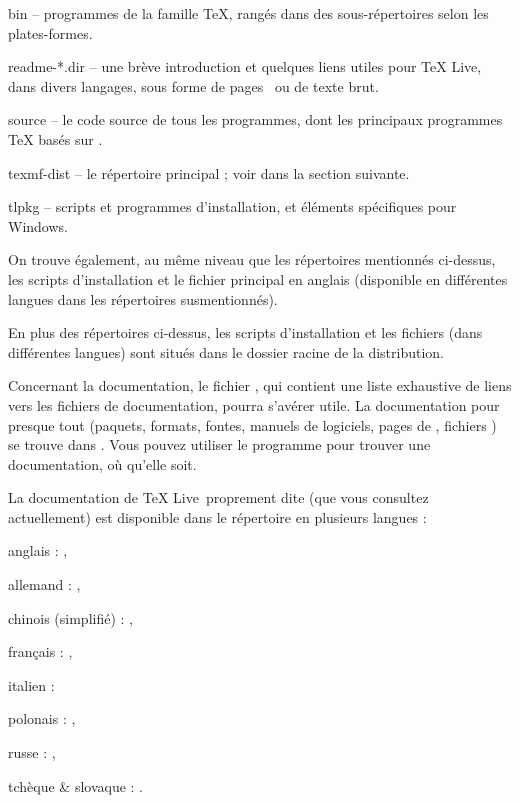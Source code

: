 \documentclass[german, english, french]{article}
\renewcommand{\TL}{\TeX{} Live\xspace}%
\begin{document}
\begin{ttdescription}
\item[bin] -- programmes de la famille \TeX{}, rangés dans des sous-répertoires
  selon les plates-formes.
%
\item[readme-*.dir] -- une brève introduction et quelques liens utiles pour \TL,
  dans divers langages, sous forme de pages \HTML\ ou de texte brut.
%
\item[source] -- le code source de tous les programmes, dont les principaux
  programmes \TeX{} basés sur \Webc{}.
%
\item[texmf-dist] -- le répertoire principal ; voir  dans la
  section suivante.
%
\item[tlpkg] -- scripts et programmes d'installation, et éléments spécifiques
  pour Windows.
\end{ttdescription}

On trouve également, au même niveau que les répertoires mentionnés ci-dessus,
les scripts d'installation et le fichier  principal en anglais
(disponible en différentes langues dans les répertoires 
susmentionnés).

En plus des répertoires ci-dessus, les scripts d'installation et les fichiers
 (dans différentes langues) sont situés dans le dossier racine
de la distribution.

Concernant la documentation, le fichier , qui contient une liste
exhaustive de liens vers les fichiers de documentation, pourra s'avérer utile.
La documentation pour presque tout (paquets, formats, fontes, manuels de
logiciels, pages de , fichiers ) se trouve dans
.  Vous pouvez utiliser le programme 
pour trouver une documentation, où qu'elle soit.

La documentation de \TL\ proprement dite (que vous consultez actuellement) est
disponible dans le répertoire  en plusieurs
langues :

\begin{itemize*}
\item{anglais :} ,
\item{allemand :} ,
\item{chinois (simplifié) :} ,
\item{français :} ,
\item{italien :} 
\item{polonais :} ,
\item{russe :} ,
\item{tchèque \& slovaque :} .
\end{itemize*}
\end{document}
